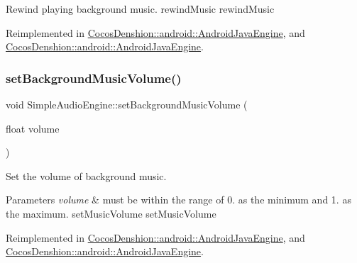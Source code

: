 Rewind playing background music.  rewind\+Music  rewind\+Music 

Reimplemented in \hyperlink{classCocosDenshion_1_1android_1_1AndroidJavaEngine_a65e37b788d03eff041fcb72754c2ed23}{Cocos\+Denshion\+::android\+::\+Android\+Java\+Engine}, and \hyperlink{classCocosDenshion_1_1android_1_1AndroidJavaEngine_a7c1e7ad61fe524b331c21c924141a34e}{Cocos\+Denshion\+::android\+::\+Android\+Java\+Engine}.

\mbox{\label{classCocosDenshion_1_1SimpleAudioEngine_a0a62f8945d7b81dbf80bae2331fa8cb3}} 
\subsubsection{\texorpdfstring{set\+Background\+Music\+Volume()}{setBackgroundMusicVolume()}\hspace{0.1cm}{\footnotesize\ttfamily [1/2]}}
{\footnotesize\ttfamily void Simple\+Audio\+Engine\+::set\+Background\+Music\+Volume (\begin{DoxyParamCaption}\item[{float}]{volume }\end{DoxyParamCaption})\hspace{0.3cm}{\ttfamily [virtual]}}

Set the volume of background music.


\begin{DoxyParams}{Parameters}
{\em volume} & must be within the range of 0. as the minimum and 1. as the maximum.  set\+Music\+Volume  set\+Music\+Volume \\
\hline
\end{DoxyParams}


Reimplemented in \hyperlink{classCocosDenshion_1_1android_1_1AndroidJavaEngine_ac134271d2bfbc3bfa9b54eeb86f4f750}{Cocos\+Denshion\+::android\+::\+Android\+Java\+Engine}, and \hyperlink{classCocosDenshion_1_1android_1_1AndroidJavaEngine_a98d2ffd728746eacce6f4471c1bd68a7}{Cocos\+Denshion\+::android\+::\+Android\+Java\+Engine}.

\mbox{\label{classCocosDenshion_1_1SimpleAudioEngine_a8cd08dcf004fc9d0f4f65baebd0d820f}} 
